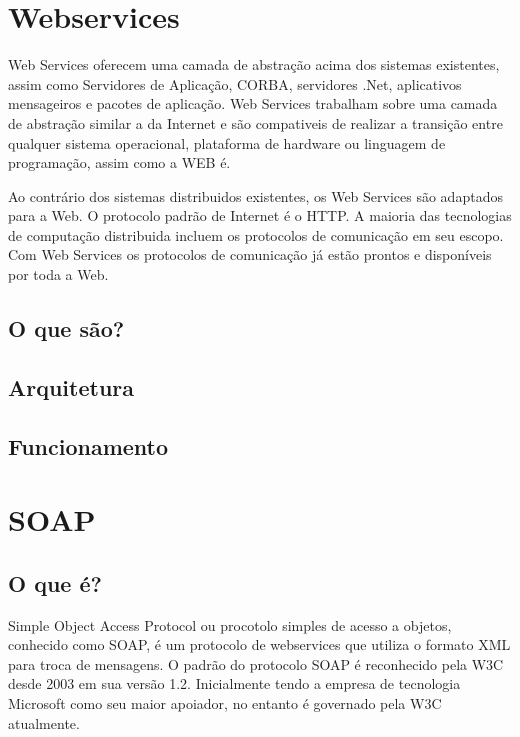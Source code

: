 \documentclass{acm_proc_article-sp}
\begin{document}
\section{Webservices}
		Web Services oferecem uma camada de abstração acima dos sistemas existentes, assim como Servidores de Aplicação, 
		CORBA, servidores .Net, aplicativos mensageiros e pacotes de aplicação. Web Services trabalham sobre 
		uma camada de abstração similar a da Internet e são compativeis de realizar a transição entre qualquer sistema operacional, 
		plataforma de hardware ou linguagem de programação, assim como a WEB é.
		
		Ao contrário dos sistemas distribuidos existentes, os Web Services são adaptados para a Web. O protocolo padrão de Internet é o HTTP. 
		A maioria das tecnologias de computação distribuida incluem os protocolos de comunicação em seu escopo. 
		Com Web Services os protocolos de comunicação já estão prontos e disponíveis por toda a Web. \cite{UNDERWEBSERVICES}

	\subsection{O que são?}
		
		
		
		
	
	\subsection{Arquitetura}
		
	\subsection{Funcionamento}
	


		
\section{SOAP}
	\subsection{O que é?}
	
		Simple Object Access Protocol ou procotolo simples de acesso a objetos, conhecido como SOAP, é um protocolo de webservices que utiliza o formato XML para troca de mensagens. O padrão do protocolo SOAP é reconhecido pela W3C desde 2003 em sua versão 1.2. Inicialmente tendo a empresa de tecnologia Microsoft como seu maior apoiador, no entanto é governado pela W3C atualmente.
		
\end{document}
